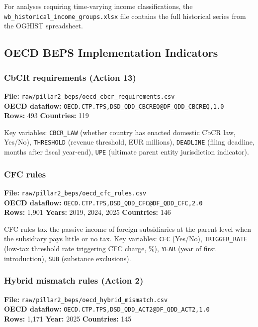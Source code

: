 \documentclass[11pt,a4paper]{article}
\newcommand{\code}[1]{\texttt{#1}}
\begin{document}
For analyses requiring time-varying income classifications, the \texttt{wb\_historical\_income\_groups.xlsx} file contains the full historical series from the OGHIST spreadsheet.

\subsection{OECD BEPS Implementation Indicators}\label{sec:beps_appendix}

\subsubsection{CbCR requirements (Action 13)}

\textbf{File:} \texttt{raw/pillar2\_beps/oecd\_cbcr\_requirements.csv}\\
\textbf{OECD dataflow:} \texttt{OECD.CTP.TPS,DSD\_QDD\_CBCREQ@DF\_QDD\_CBCREQ,1.0}\\
\textbf{Rows:} 493 \quad \textbf{Countries:} 119

Key variables: \code{CBCR\_LAW} (whether country has enacted domestic CbCR law, Yes/No), \code{THRESHOLD} (revenue threshold, EUR millions), \code{DEADLINE} (filing deadline, months after fiscal year-end), \code{UPE} (ultimate parent entity jurisdiction indicator).


\subsubsection{CFC rules}

\textbf{File:} \texttt{raw/pillar2\_beps/oecd\_cfc\_rules.csv}\\
\textbf{OECD dataflow:} \texttt{OECD.CTP.TPS,DSD\_QDD\_CFC@DF\_QDD\_CFC,2.0}\\
\textbf{Rows:} 1{,}901 \quad \textbf{Years:} 2019, 2024, 2025 \quad \textbf{Countries:} 146

CFC rules tax the passive income of foreign subsidiaries at the parent level when the subsidiary pays little or no tax.  Key variables: \code{CFC} (Yes/No), \code{TRIGGER\_RATE} (low-tax threshold rate triggering CFC charge, \%), \code{YEAR} (year of first introduction), \code{SUB} (substance exclusions).

\subsubsection{Hybrid mismatch rules (Action 2)}

\textbf{File:} \texttt{raw/pillar2\_beps/oecd\_hybrid\_mismatch.csv}\\
\textbf{OECD dataflow:} \texttt{OECD.CTP.TPS,DSD\_QDD\_ACT2@DF\_QDD\_ACT2,1.0}\\
\textbf{Rows:} 1{,}171 \quad \textbf{Year:} 2025 \quad \textbf{Countries:} 145
\end{document}
